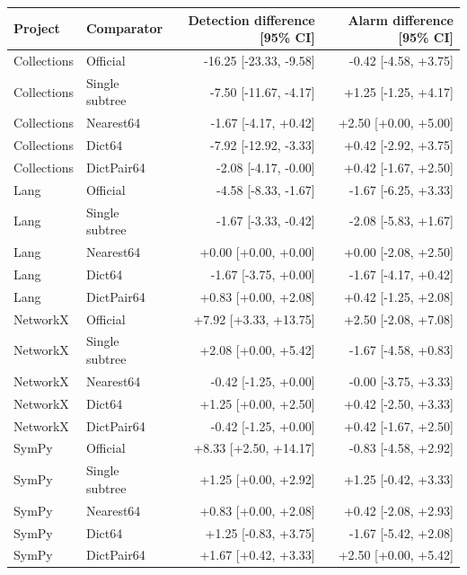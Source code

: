 \begin{tabular}{llrr}
\toprule
Project & Comparator & Detection difference [95\% CI] & Alarm difference [95\% CI] \\
\midrule
Collections & Official & -16.25 [-23.33, -9.58] & -0.42 [-4.58, +3.75] \\
Collections & Single subtree & -7.50 [-11.67, -4.17] & +1.25 [-1.25, +4.17] \\
Collections & Nearest64 & -1.67 [-4.17, +0.42] & +2.50 [+0.00, +5.00] \\
Collections & Dict64 & -7.92 [-12.92, -3.33] & +0.42 [-2.92, +3.75] \\
Collections & DictPair64 & -2.08 [-4.17, -0.00] & +0.42 [-1.67, +2.50] \\
Lang & Official & -4.58 [-8.33, -1.67] & -1.67 [-6.25, +3.33] \\
Lang & Single subtree & -1.67 [-3.33, -0.42] & -2.08 [-5.83, +1.67] \\
Lang & Nearest64 & +0.00 [+0.00, +0.00] & +0.00 [-2.08, +2.50] \\
Lang & Dict64 & -1.67 [-3.75, +0.00] & -1.67 [-4.17, +0.42] \\
Lang & DictPair64 & +0.83 [+0.00, +2.08] & +0.42 [-1.25, +2.08] \\
NetworkX & Official & +7.92 [+3.33, +13.75] & +2.50 [-2.08, +7.08] \\
NetworkX & Single subtree & +2.08 [+0.00, +5.42] & -1.67 [-4.58, +0.83] \\
NetworkX & Nearest64 & -0.42 [-1.25, +0.00] & -0.00 [-3.75, +3.33] \\
NetworkX & Dict64 & +1.25 [+0.00, +2.50] & +0.42 [-2.50, +3.33] \\
NetworkX & DictPair64 & -0.42 [-1.25, +0.00] & +0.42 [-1.67, +2.50] \\
SymPy & Official & +8.33 [+2.50, +14.17] & -0.83 [-4.58, +2.92] \\
SymPy & Single subtree & +1.25 [+0.00, +2.92] & +1.25 [-0.42, +3.33] \\
SymPy & Nearest64 & +0.83 [+0.00, +2.08] & +0.42 [-2.08, +2.93] \\
SymPy & Dict64 & +1.25 [-0.83, +3.75] & -1.67 [-5.42, +2.08] \\
SymPy & DictPair64 & +1.67 [+0.42, +3.33] & +2.50 [+0.00, +5.42] \\
\bottomrule
\end{tabular}
